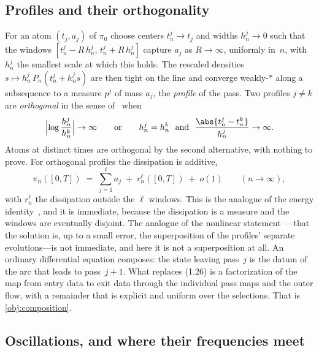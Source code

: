 \subsection{Profiles and their orthogonality}\label{sec:time-profiles}

For an atom $(t_j,a_j)$ of $\pi_0$ choose centers $t_n^j\to t_j$ and widths
$h_n^j\to 0$ such that the windows
$[t_n^j - R\,h_n^j,\, t_n^j + R\,h_n^j]$ capture $a_j$ as $R\to\infty$,
uniformly in~$n$, with $h_n^j$ the smallest scale at which this holds. The
rescaled densities $s\mapsto h_n^j\,P_n(t_n^j + h_n^j s)$ are then tight on
the line and converge weakly-$*$ along a subsequence to a measure $p^j$ of
mass $a_j$, the \emph{profile} of the pass. Two profiles $j\ne k$ are
\emph{orthogonal} in the sense of~\cite[(1.18)]{bahouri1999high} when
\[
  \Bigl|\log\frac{h_n^j}{h_n^k}\Bigr| \to \infty
  \qquad\text{or}\qquad
  h_n^j = h_n^k \ \text{ and } \
  \frac{\abs{t_n^j - t_n^k}}{h_n^j}\to\infty .
\]
Atoms at distinct times are orthogonal by the second alternative, with
nothing to prove. For orthogonal profiles the dissipation is additive,
\begin{equation}\label{eq:additivity}
  \pi_n([0,T])
  \;=\; \sum_{j=1}^{\ell} a_j \;+\; r_n^\ell([0,T]) \;+\; o(1)
  \qquad(n\to\infty),
\end{equation}
with $r_n^\ell$ the dissipation outside the $\ell$ windows. This is the analogue
of the energy identity~\cite[(1.25)]{bahouri1999high}, and it is immediate,
because the dissipation is a measure and the windows are eventually
disjoint. The analogue of the nonlinear
statement~\cite[(1.26)]{bahouri1999high}---that the solution is, up to a
small error, the superposition of the profiles' separate evolutions---is
not immediate, and here it is not a superposition at all. An ordinary
differential equation composes: the state leaving pass~$j$ is the datum of
the arc that leads to pass~$j+1$. What replaces (1.26) is a factorization
of the map from entry data to exit data through the individual pass maps
and the outer flow, with a remainder that is explicit and uniform over the
selections. That is \cref{obj:composition}.

\subsection{Oscillations, and where their frequencies meet}
\label{sec:time-joint}

